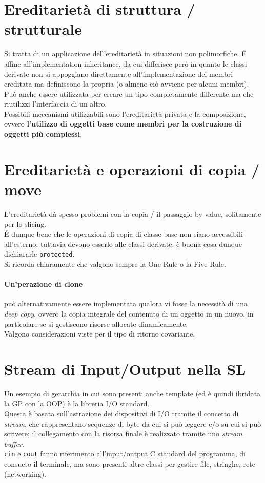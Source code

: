 \documentclass[10pt, oneside]{book}
\begin{document}
\section{Ereditarietà di struttura / strutturale}
Si tratta di un applicazione dell'ereditarietà in situazioni non polimorfiche. \'E affine all'implementation inheritance, da cui differisce però in quanto le classi derivate non si appoggiano direttamente all'implementazione dei membri ereditata ma definiscono la propria (o almeno ciò avviene per alcuni membri).\\
Può anche essere utilizzata per creare un tipo completamente differente ma che riutilizzi l'interfaccia di un altro.\\
Possibili meccanismi utilizzabili sono l'ereditarietà privata e la composizione, ovvero \textbf{l'utilizzo di oggetti base come membri per la costruzione di oggetti più complessi}.

\section{Ereditarietà e operazioni di copia / move}
L'ereditarietà dà spesso problemi con la copia / il passaggio by value, solitamente per lo slicing.\\
\'E dunque bene che le operazioni di copia di classe base non siano accessibili all'esterno; tuttavia devono esserlo alle classi derivate: è buona cosa dunque dichiararle \texttt{protected}.\\
Si ricorda chiaramente che valgono sempre la One Rule o la Five Rule.

\paragraph{Un'perazione di clone} può alternativamente essere implementata qualora vi fosse la necessità di una \textit{deep copy}, ovvero la copia integrale del contenuto di un oggetto in un nuovo, in particolare se si gestiscono risorse allocate dinamicamente.\\
Valgono considerazioni viste per il tipo di ritorno covariante.





\section{Stream di Input/Output nella SL}
Un esempio di gerarchia in cui sono presenti anche template (ed è quindi ibridata la GP con la OOP) è la libreria I/O standard.\\
Questa è basata sull'astrazione dei dispositivi di I/O tramite il concetto di \textit{stream}, che rappresentano sequenze di byte da cui si può leggere e/o su cui si può scrivere; il collegamento con la risorsa finale è realizzato tramite uno \textit{stream buffer}.\\
\texttt{cin} e \texttt{cout} fanno riferimento all'input/output C standard del programma, di consueto il terminale, ma sono presenti altre classi per gestire file, stringhe, rete (networking).
\end{document}
